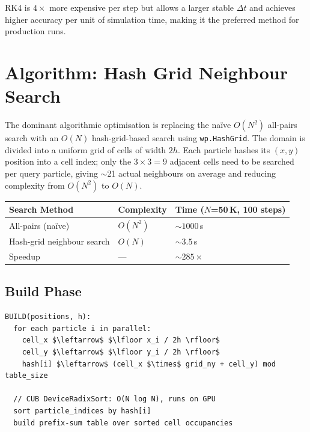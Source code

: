 \documentclass[11pt,a4paper]{article}
\begin{document}
RK4 is $4\times$ more expensive per step but allows a larger stable $\Delta t$ and achieves
higher accuracy per unit of simulation time, making it the preferred method for production runs.

\section{Algorithm: Hash Grid Neighbour Search}

The dominant algorithmic optimisation is replacing the naïve $O(N^2)$ all-pairs search with an
$O(N)$ hash-grid-based search using \texttt{wp.HashGrid}. The domain is divided into a uniform
grid of cells of width $2h$. Each particle hashes its $(x,y)$ position into a cell index; only
the $3\times3 = 9$ adjacent cells need to be searched per query particle, giving $\sim$21
actual neighbours on average and reducing complexity from $O(N^2)$ to $O(N)$.

\vspace{4pt}
\begin{center}
\begin{tabular}{lll}
  \toprule
  \textbf{Search Method} & \textbf{Complexity} & \textbf{Time ($N$=50\,K, 100 steps)} \\
  \midrule
  All-pairs (naïve)          & $O(N^2)$ & ${\sim}1000$\,s \\
  Hash-grid neighbour search & $O(N)$   & ${\sim}3.5$\,s \\
  Speedup                    & —        & ${\sim}285\times$ \\
  \bottomrule
\end{tabular}
\end{center}

\subsection{Build Phase}

\begin{lstlisting}
BUILD(positions, h):
  for each particle i in parallel:
    cell_x $\leftarrow$ $\lfloor x_i / 2h \rfloor$
    cell_y $\leftarrow$ $\lfloor y_i / 2h \rfloor$
    hash[i] $\leftarrow$ (cell_x $\times$ grid_ny + cell_y) mod table_size

  // CUB DeviceRadixSort: O(N log N), runs on GPU
  sort particle_indices by hash[i]
  build prefix-sum table over sorted cell occupancies
\end{lstlisting}
\end{document}
